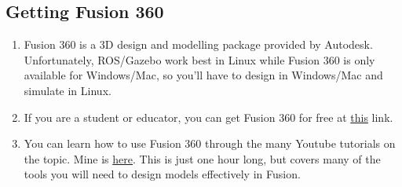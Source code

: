 \documentclass{article}
\begin{document}
        \subsection{Getting Fusion 360}
            \begin{enumerate}
                \item Fusion 360 is a 3D design and modelling package provided by Autodesk.
                Unfortunately, ROS/Gazebo work best in Linux while Fusion 360 is only 
                available for Windows/Mac, so you'll have to design in Windows/Mac and 
                simulate in Linux.
                \item If you are a student or educator, you can get Fusion 360 for free at
                \href{https://www.autodesk.com/products/fusion-360/students-teachers-educators}{this} link.

                \item You can learn how to use Fusion 360 through the many Youtube tutorials on
                the topic. Mine is \href{https://youtu.be/dnE5-s0SR-M?t=798}{here}. This is 
                just one hour long, but covers many of the tools you will need to design models
                effectively in Fusion. 
            \end{enumerate}
        \newpage
\end{document}
